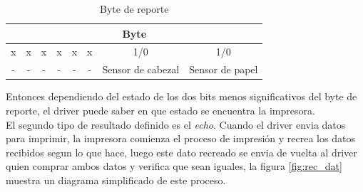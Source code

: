 \begin{table}[ht]
\centering
\begin{tabular}{|c|c|c|c|c|c|c|c|}									\hline
\multicolumn{8}{|c|}{Byte}										\\	\hline
x & x & x & x & x & x & 1/0 & 1/0 								\\ 	\hline
- & - & - & - & - & - & Sensor de cabezal & Sensor de papel		\\	\hline
\end{tabular}
\caption{Byte de reporte} 
\label{tab:report_byte}
\end{table}

Entonces dependiendo del estado de los dos bits menos significativos del byte
de reporte, el driver puede saber en que estado se encuentra la impresora.\\

El segundo tipo de resultado definido es el \emph{echo}. Cuando el driver
envia datos para imprimir, la impresora comienza el proceso de impresi\'on y
recrea los datos recibidos segun lo que hace, luego este dato recreado
se envia de vuelta al driver quien comprar ambos datos y verifica que sean
iguales, la figura \ref{fig:rec_dat} muestra un diagrama simplificado de este
proceso.

